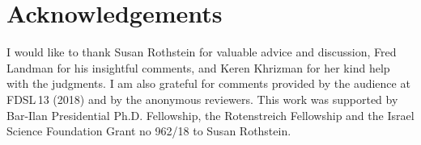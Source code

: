 \documentclass[output=paper]{langscibook}
\begin{document}
\section*{Acknowledgements}
I would like to thank Susan Rothstein for valuable advice and discussion, Fred Landman for his insightful comments, and Keren Khrizman for her kind help with the judgments. I am also grateful for comments provided by the audience at FDSL\,13 (2018) and by the anonymous reviewers. This work was supported by Bar-Ilan Presidential Ph.D. Fellowship, the Rotenstreich Fellowship and the Israel Science Foundation Grant no 962/18 to Susan Rothstein.  

{\sloppy\printbibliography[heading=subbibliography,notkeyword=this]}
\end{document}
